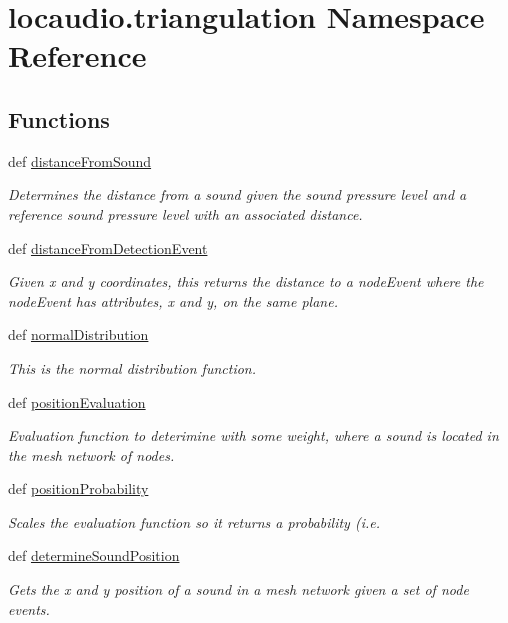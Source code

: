 \hypertarget{namespacelocaudio_1_1triangulation}{\section{locaudio.\-triangulation Namespace Reference}
\label{namespacelocaudio_1_1triangulation}
}
\subsection*{Functions}
\begin{DoxyCompactItemize}
\item 
def \hyperlink{namespacelocaudio_1_1triangulation_a4a7017521badc87c46d0b84774d70b2f}{distance\-From\-Sound}
\begin{DoxyCompactList}\small\item\em Determines the distance from a sound given the sound pressure level and a reference sound pressure level with an associated distance. \end{DoxyCompactList}\item 
def \hyperlink{namespacelocaudio_1_1triangulation_ac52a12426ddad7f84fd8fdce6d53a7e0}{distance\-From\-Detection\-Event}
\begin{DoxyCompactList}\small\item\em Given x and y coordinates, this returns the distance to a node\-Event where the node\-Event has attributes, x and y, on the same plane. \end{DoxyCompactList}\item 
def \hyperlink{namespacelocaudio_1_1triangulation_aeda79115af2a41e618d834fe29a63104}{normal\-Distribution}
\begin{DoxyCompactList}\small\item\em This is the normal distribution function. \end{DoxyCompactList}\item 
def \hyperlink{namespacelocaudio_1_1triangulation_af600bbadd299c94825b159b5df236f6f}{position\-Evaluation}
\begin{DoxyCompactList}\small\item\em Evaluation function to deterimine with some weight, where a sound is located in the mesh network of nodes. \end{DoxyCompactList}\item 
def \hyperlink{namespacelocaudio_1_1triangulation_af708227f069b847392f730d13060cce8}{position\-Probability}
\begin{DoxyCompactList}\small\item\em Scales the evaluation function so it returns a probability (i.\-e. \end{DoxyCompactList}\item 
def \hyperlink{namespacelocaudio_1_1triangulation_abd8cf1c3aaf884f1c97cbeb6c853f697}{determine\-Sound\-Position}
\begin{DoxyCompactList}\small\item\em Gets the x and y position of a sound in a mesh network given a set of node events. \end{DoxyCompactList}\end{DoxyCompactItemize}

